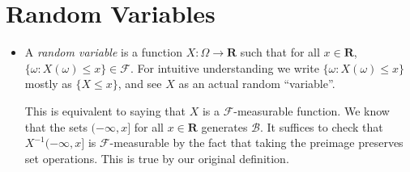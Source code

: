 \documentclass[11pt]{article}
\newcommand{\df}[1]{\textit{\textsf{#1}}} %
\newcommand{\R}{\mathbf{R}}
\newcommand{\B}{\mathcal{B}} %
\newcommand{\F}{\mathcal{F}} %
\begin{document}
\section{Random Variables}
\begin{itemize}
    \item A \df{random variable} is a function $X: \Omega \to \R$ such that for all $x \in \R$, $\{\omega : X(\omega) \leq x\} \in \F$. For intuitive understanding we write $\{\omega : X(\omega) \leq x\}$ mostly as $\{X \leq x\}$, and see $X$ as an actual random ``variable''.
    
    This is equivalent to saying that $X$ is a $\F$-measurable function. We know that the sets $(-\infty, x]$ for all $x \in \R$ generates $\B$. It suffices to check that $X^{-1}(-\infty, x]$ is $\F$-measurable by the fact that taking the preimage preserves set operations. This is true by our original definition.
    

\end{itemize}
\end{document}
